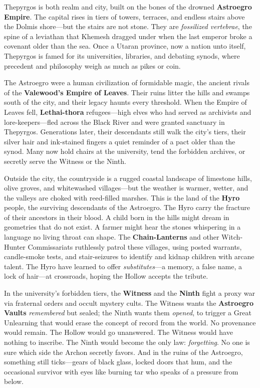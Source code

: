 \vspace{2mm}
\begin{tcolorbox}[colback=black!3,colframe=blue!60!black,title={Theme \& Atmosphere},breakable]
Thepyrgos is both realm and city, built on the bones of the drowned \textbf{Astroegro Empire}. The capital rises in tiers of towers, terraces, and endless stairs above the Dolmis shore---but the stairs are not stone. They are \emph{fossilized vertebrae}, the spine of a leviathan that Khemesh dragged under when the last emperor broke a covenant older than the sea. Once a Utaran province, now a nation unto itself, Thepyrgos is famed for its universities, libraries, and debating synods, where precedent and philosophy weigh as much as pikes or coin.

The Astroegro were a human civilization of formidable magic, the ancient rivals of the \textbf{Valewood's Empire of Leaves}. Their ruins litter the hills and swamps south of the city, and their legacy haunts every threshold. When the Empire of Leaves fell, \textbf{Lethai-thora} refugees---high elves who had served as archivists and lore-keepers---fled across the Black River and were granted sanctuary in Thepyrgos. Generations later, their descendants still walk the city's tiers, their silver hair and ink-stained fingers a quiet reminder of a pact older than the synod. Many now hold chairs at the university, tend the forbidden archives, or secretly serve the Witness or the Ninth.

Outside the city, the countryside is a rugged coastal landscape of limestone hills, olive groves, and whitewashed villages---but the weather is warmer, wetter, and the valleys are choked with reed-filled marshes. This is the land of the \textbf{Hyro} people, the surviving descendants of the Astroegro. The Hyro carry the fracture of their ancestors in their blood. A child born in the hills might dream in geometries that do not exist. A farmer might hear the stones whispering in a language no living throat can shape. The \textbf{Chain-Lanterns} and other Witch-Hunter Commissariats ruthlessly patrol these villages, using posted warrants, candle-smoke tests, and stair-seizures to identify and kidnap children with arcane talent. The Hyro have learned to offer \emph{substitutes}---a memory, a false name, a lock of hair---at crossroads, hoping the Hollow accepts the tribute.

In the university's forbidden tiers, the \textbf{Witness} and the \textbf{Ninth} fight a proxy war via fraternal orders and occult mystery cults. The Witness wants the \textbf{Astroegro Vaults} \emph{remembered} but sealed; the Ninth wants them \emph{opened}, to trigger a Great Unlearning that would erase the concept of record from the world. No provenance would remain. The Hollow would go unanswered. The Witness would have nothing to inscribe. The Ninth would become the only law: \emph{forgetting}. No one is sure which side the Archon secretly favors. And in the ruins of the Astroegro, something still ticks---gears of black glass, locked doors that hum, and the occasional survivor with eyes like burning tar who speaks of a pressure from below.


\end{tcolorbox}
